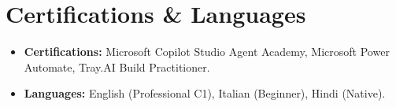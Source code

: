 \documentclass[11pt,a4paper,sans]{moderncv}
\begin{document}

\section{Certifications \& Languages}
\begin{itemize}
\item \textbf{Certifications:} Microsoft Copilot Studio Agent Academy, Microsoft Power Automate, Tray.AI Build Practitioner.
\item \textbf{Languages:} English (Professional C1), Italian (Beginner), Hindi (Native).
\end{itemize}
\end{document}
